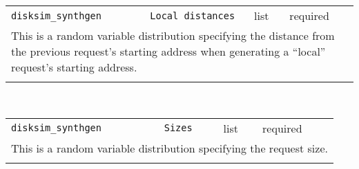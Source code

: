 \noindent 
\begin{tabular}{|p{\lpmodwidth}|p{\lpnamewidth}|p{0.5in}|p{0.5in}|}
\cline{1-4}
\texttt{disksim\_synthgen} & \texttt{Local distances} & list & required \\ 
\cline{1-4}
\multicolumn{4}{|p{6in}|}{
This is a random variable distribution specifying the distance from the
previous request's starting address when generating a ``local''
request's starting address.
}\\ 
\cline{1-4}
\multicolumn{4}{p{5in}}{}\\
\end{tabular}\\ 
\noindent 
\begin{tabular}{|p{\lpmodwidth}|p{\lpnamewidth}|p{0.5in}|p{0.5in}|}
\cline{1-4}
\texttt{disksim\_synthgen} & \texttt{Sizes} & list & required \\ 
\cline{1-4}
\multicolumn{4}{|p{6in}|}{
This is a random variable distribution specifying the request size.
}\\ 
\cline{1-4}
\multicolumn{4}{p{5in}}{}\\
\end{tabular}\\ 
